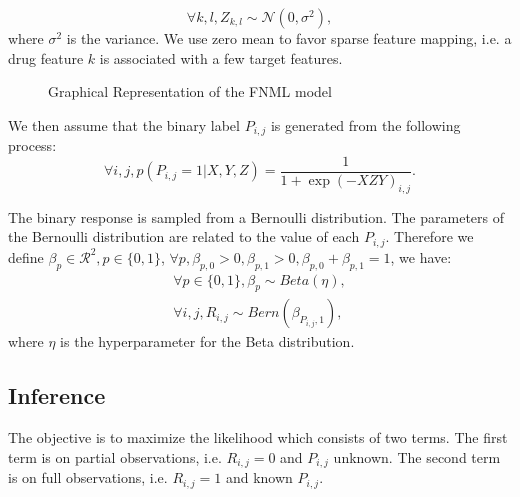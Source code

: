 \documentclass[sigconf,anonymous]{acmart}
\begin{document}
\begin{equation}\label{equ:z}
\forall k,l, Z_{k,l}\sim \mathcal{N}(0,\sigma^2),
\end{equation}
where $\sigma^2$ is the variance. We use zero mean to favor sparse feature mapping, i.e. a drug feature $k$ is associated with a few target features.

\begin{figure}
  \centering
{}
\vspace*{-5pt}
\caption{Graphical Representation of the FNML model}\label{fig:model}
\end{figure}

We then assume that the binary label $P_{i,j}$ is generated from the following process:
\begin{equation}\label{equ:p}
\forall i,j, p(P_{i,j}=1|X,Y,Z)=\frac{1}{1+\exp{(-XZY)}_{i,j}}.
\end{equation}

The binary response is sampled from a Bernoulli distribution. The parameters of the Bernoulli distribution are related to the value of each $P_{i,j}$. Therefore we define $\beta_p\in\mathcal{R}^{2},p\in \{0,1\}$, $\forall p, \beta_{p,0}>0,\beta_{p,1}>0,\beta_{p,0}+\beta_{p,1}=1$, we have:
\begin{eqnarray}
\forall p\in \{0,1\}, \beta_p \sim Beta(\eta),\\
\forall i,j, R_{i,j} \sim Bern (\beta_{P_{i,j},1}),
\end{eqnarray}
where $\eta$ is the hyperparameter for the Beta distribution.

\subsection{Inference}\label{sec:inference}
The objective is to maximize the likelihood which consists of two terms. The first term is on partial observations, i.e. $R_{i,j}=0$ and $P_{i,j}$ unknown. The second term is on full observations, i.e. $R_{i,j}=1$ and known $P_{i,j}$.
\end{document}
